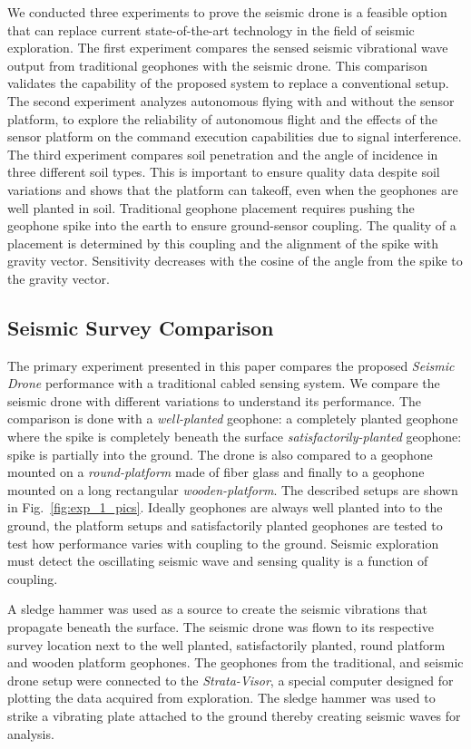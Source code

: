We conducted three experiments to prove the seismic drone is a feasible option that can replace current state-of-the-art technology in the field of seismic exploration. The first experiment compares the sensed seismic vibrational wave output from traditional geophones with the seismic drone. This comparison validates the capability  of the proposed system to replace a conventional setup. The second experiment analyzes autonomous flying with and without the sensor platform, to explore the reliability of autonomous flight and the effects of the sensor platform on the command execution capabilities due to signal interference. The third experiment compares soil penetration and the angle of incidence in three different soil types. This is important to ensure quality data despite soil variations and shows that the platform can takeoff, even when the geophones are well planted in soil. Traditional geophone placement requires pushing the geophone spike into the earth to ensure ground-sensor coupling. The quality of a placement is determined by this coupling and the alignment of the spike with gravity vector. Sensitivity decreases with the cosine of the angle from the spike to the gravity vector.

\subsection{Seismic Survey Comparison}

The primary experiment presented in this paper compares the proposed \emph{Seismic Drone} performance with a traditional cabled sensing system. We compare the seismic drone with different variations to understand its performance. The comparison is done with a \emph{well-planted} geophone: a completely planted geophone where the spike is completely beneath the surface \emph{satisfactorily-planted} geophone: spike is partially into the ground. The drone is also compared to a geophone mounted on a \emph{round-platform} made of fiber glass and finally to a geophone mounted on a long rectangular \emph{wooden-platform}. The described setups are shown in Fig.~\ref{fig:exp_1_pics}. Ideally geophones are always well planted into to the ground, the platform setups and satisfactorily planted geophones are tested to test how performance varies with coupling to the ground. Seismic exploration must detect the oscillating seismic wave and sensing quality is a function of coupling. 

A sledge hammer was used as a source to create the seismic vibrations that propagate beneath the surface. The seismic drone was flown to its respective survey location next to the well planted, satisfactorily planted, round platform and wooden platform geophones. The geophones from the traditional, and seismic drone setup were connected to the \emph{Strata-Visor}, a special computer designed for plotting the data acquired from exploration. The sledge hammer was used to strike a vibrating plate attached to the ground thereby creating seismic waves for analysis.

